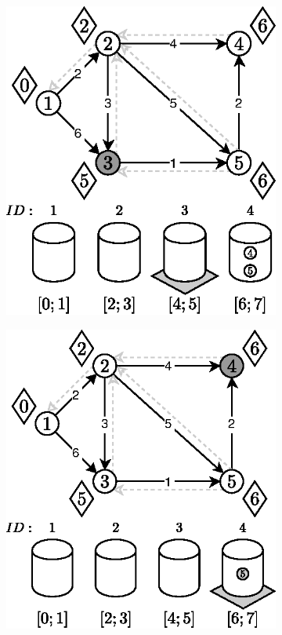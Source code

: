 \begin{figure}[!htbp]
\begin{subfigure}[b]{0.33\textwidth}
		\caption{}
	\end{subfigure}
	\begin{subfigure}[b]{0.33\textwidth}
		\includegraphics[width=\textwidth]{Chapter_II/3/d.eps}
		\caption{}
	\end{subfigure}%
	\begin{subfigure}[b]{0.33\textwidth}
		\includegraphics[width=\textwidth]{Chapter_II/3/e.eps}

\end{subfigure}
\end{figure}
